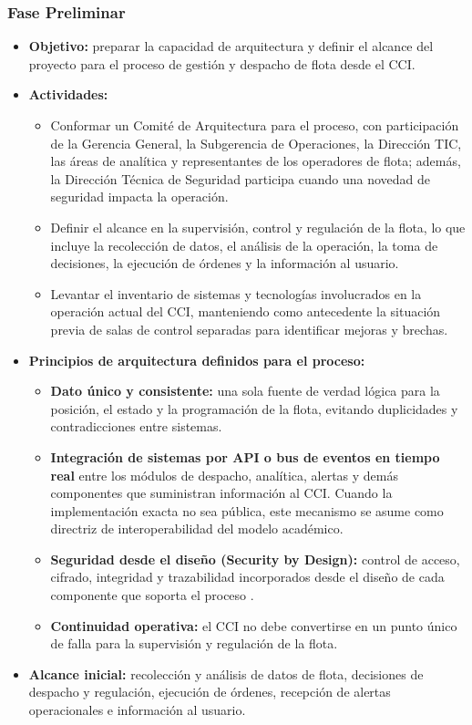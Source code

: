 \begin{singlespace}

\subsubsection*{Fase Preliminar}

\begin{itemize}
	\item \textbf{Objetivo:} preparar la capacidad de arquitectura y definir el alcance del proyecto para el proceso de gestión y despacho de flota desde el CCI.
	\item \textbf{Actividades:}
	\begin{itemize}
		\item[$\Rightarrow$] Conformar un Comité de Arquitectura para el proceso, con participación de la Gerencia General, la Subgerencia de Operaciones, la Dirección TIC, las áreas de analítica y representantes de los operadores de flota; además, la Dirección Técnica de Seguridad participa cuando una novedad de seguridad impacta la operación.
		\item[$\Rightarrow$] Definir el alcance en la supervisión, control y regulación de la flota, lo que incluye la recolección de datos, el análisis de la operación, la toma de decisiones, la ejecución de órdenes y la información al usuario.
		\item[$\Rightarrow$] Levantar el inventario de sistemas y tecnologías involucrados en la operación actual del CCI, manteniendo como antecedente la situación previa de salas de control separadas para identificar mejoras y brechas.
	\end{itemize}
	\item \textbf{Principios de arquitectura definidos para el proceso:}
	\begin{itemize}
		\item[$\Rightarrow$] \textbf{Dato único y consistente:} una sola fuente de verdad lógica para la posición, el estado y la programación de la flota, evitando duplicidades y contradicciones entre sistemas.
		\item[$\Rightarrow$] \textbf{Integración de sistemas por API o bus de eventos en tiempo real} entre los módulos de despacho, analítica, alertas y demás componentes que suministran información al CCI. Cuando la implementación exacta no sea pública, este mecanismo se asume como directriz de interoperabilidad del modelo académico.
		\item[$\Rightarrow$] \textbf{Seguridad desde el diseño (Security by Design):} control de acceso, cifrado, integridad y trazabilidad incorporados desde el diseño de cada componente que soporta el proceso \parencite{mintic2021}.
		\item[$\Rightarrow$] \textbf{Continuidad operativa:} el CCI no debe convertirse en un punto único de falla para la supervisión y regulación de la flota.
	\end{itemize}
	\item \textbf{Alcance inicial:} recolección y análisis de datos de flota, decisiones de despacho y regulación, ejecución de órdenes, recepción de alertas operacionales e información al usuario.
\end{itemize}


\end{singlespace}
